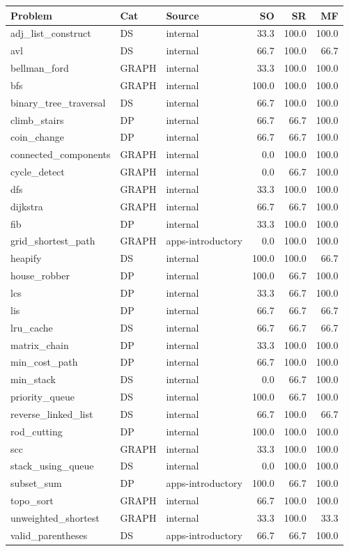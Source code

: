\begin{tabular}{@{}lllrrr@{}}
\toprule
Problem & Cat & Source & SO & SR & MF \\
\midrule
adj\_list\_construct & DS & internal & 33.3 & 100.0 & 100.0 \\
avl & DS & internal & 66.7 & 100.0 & 66.7 \\
bellman\_ford & GRAPH & internal & 33.3 & 100.0 & 100.0 \\
bfs & GRAPH & internal & 100.0 & 100.0 & 100.0 \\
binary\_tree\_traversal & DS & internal & 66.7 & 100.0 & 100.0 \\
climb\_stairs & DP & internal & 66.7 & 66.7 & 100.0 \\
coin\_change & DP & internal & 66.7 & 66.7 & 100.0 \\
connected\_components & GRAPH & internal & 0.0 & 100.0 & 100.0 \\
cycle\_detect & GRAPH & internal & 0.0 & 66.7 & 100.0 \\
dfs & GRAPH & internal & 33.3 & 100.0 & 100.0 \\
dijkstra & GRAPH & internal & 66.7 & 66.7 & 100.0 \\
fib & DP & internal & 33.3 & 100.0 & 100.0 \\
grid\_shortest\_path & GRAPH & apps-introductory & 0.0 & 100.0 & 100.0 \\
heapify & DS & internal & 100.0 & 100.0 & 66.7 \\
house\_robber & DP & internal & 100.0 & 66.7 & 100.0 \\
lcs & DP & internal & 33.3 & 66.7 & 100.0 \\
lis & DP & internal & 66.7 & 66.7 & 66.7 \\
lru\_cache & DS & internal & 66.7 & 66.7 & 66.7 \\
matrix\_chain & DP & internal & 33.3 & 100.0 & 100.0 \\
min\_cost\_path & DP & internal & 66.7 & 100.0 & 100.0 \\
min\_stack & DS & internal & 0.0 & 66.7 & 100.0 \\
priority\_queue & DS & internal & 100.0 & 66.7 & 100.0 \\
reverse\_linked\_list & DS & internal & 66.7 & 100.0 & 66.7 \\
rod\_cutting & DP & internal & 100.0 & 100.0 & 100.0 \\
scc & GRAPH & internal & 33.3 & 100.0 & 100.0 \\
stack\_using\_queue & DS & internal & 0.0 & 100.0 & 100.0 \\
subset\_sum & DP & apps-introductory & 100.0 & 66.7 & 100.0 \\
topo\_sort & GRAPH & internal & 66.7 & 100.0 & 100.0 \\
unweighted\_shortest & GRAPH & internal & 33.3 & 100.0 & 33.3 \\
valid\_parentheses & DS & apps-introductory & 66.7 & 66.7 & 100.0 \\
\bottomrule
\end{tabular}
